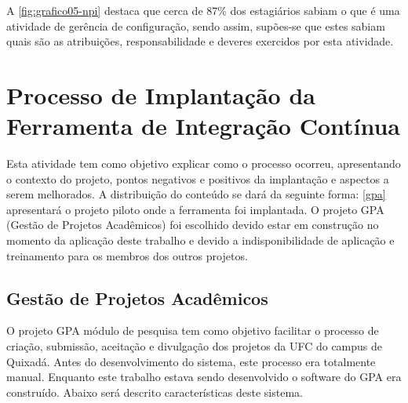A \autoref{fig:grafico05-npi} destaca que cerca de 87\% dos estagiários sabiam o que é uma atividade de gerência de configuração, sendo assim, supões-se que estes sabiam quais são as atribuições, responsabilidade e deveres exercidos por esta atividade. 

\section{Processo de Implantação da Ferramenta de Integração Contínua}\label{processoimpl}
Esta atividade tem como objetivo explicar como o processo ocorreu, apresentando o contexto do projeto, pontos negativos e positivos da implantação e aspectos a serem melhorados. A distribuição do conteúdo se dará da seguinte forma: \autoref{gpa} apresentará o projeto piloto onde a ferramenta foi implantada. O projeto GPA (Gestão de Projetos Acadêmicos) foi escolhido devido estar em construção no momento da aplicação deste trabalho e devido a indisponibilidade de aplicação e treinamento para os membros dos outros projetos.


\subsection{Gestão de Projetos Acadêmicos }\label{gpa}
O projeto GPA módulo de pesquisa tem como objetivo facilitar o processo de criação, submissão, aceitação e divulgação dos projetos da UFC do campus de Quixadá. Antes do desenvolvimento do sistema, este processo era totalmente manual. Enquanto este trabalho estava sendo desenvolvido o software do GPA era construído. Abaixo será descrito características deste sistema.

